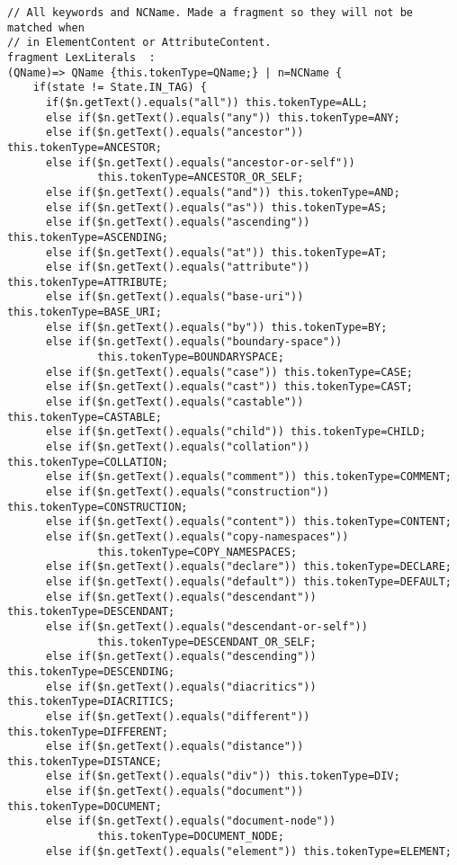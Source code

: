 \begin{Verbatim}[frame=none, fontsize=\footnotesize]
// All keywords and NCName. Made a fragment so they will not be matched when
// in ElementContent or AttributeContent.
fragment LexLiterals  : 
(QName)=> QName {this.tokenType=QName;} | n=NCName {
    if(state != State.IN_TAG) {
      if($n.getText().equals("all")) this.tokenType=ALL;
      else if($n.getText().equals("any")) this.tokenType=ANY;
      else if($n.getText().equals("ancestor")) this.tokenType=ANCESTOR;
      else if($n.getText().equals("ancestor-or-self")) 
              this.tokenType=ANCESTOR_OR_SELF;
      else if($n.getText().equals("and")) this.tokenType=AND;
      else if($n.getText().equals("as")) this.tokenType=AS;
      else if($n.getText().equals("ascending")) this.tokenType=ASCENDING;
      else if($n.getText().equals("at")) this.tokenType=AT;
      else if($n.getText().equals("attribute")) this.tokenType=ATTRIBUTE;
      else if($n.getText().equals("base-uri")) this.tokenType=BASE_URI;
      else if($n.getText().equals("by")) this.tokenType=BY;
      else if($n.getText().equals("boundary-space")) 
              this.tokenType=BOUNDARYSPACE;
      else if($n.getText().equals("case")) this.tokenType=CASE;
      else if($n.getText().equals("cast")) this.tokenType=CAST;
      else if($n.getText().equals("castable")) this.tokenType=CASTABLE;
      else if($n.getText().equals("child")) this.tokenType=CHILD;
      else if($n.getText().equals("collation")) this.tokenType=COLLATION;
      else if($n.getText().equals("comment")) this.tokenType=COMMENT;
      else if($n.getText().equals("construction")) this.tokenType=CONSTRUCTION;
      else if($n.getText().equals("content")) this.tokenType=CONTENT;
      else if($n.getText().equals("copy-namespaces")) 
              this.tokenType=COPY_NAMESPACES;
      else if($n.getText().equals("declare")) this.tokenType=DECLARE;
      else if($n.getText().equals("default")) this.tokenType=DEFAULT;
      else if($n.getText().equals("descendant")) this.tokenType=DESCENDANT;
      else if($n.getText().equals("descendant-or-self"))  
              this.tokenType=DESCENDANT_OR_SELF;
      else if($n.getText().equals("descending")) this.tokenType=DESCENDING;
      else if($n.getText().equals("diacritics")) this.tokenType=DIACRITICS;
      else if($n.getText().equals("different")) this.tokenType=DIFFERENT;
      else if($n.getText().equals("distance")) this.tokenType=DISTANCE;
      else if($n.getText().equals("div")) this.tokenType=DIV;
      else if($n.getText().equals("document")) this.tokenType=DOCUMENT;
      else if($n.getText().equals("document-node")) 
              this.tokenType=DOCUMENT_NODE;
      else if($n.getText().equals("element")) this.tokenType=ELEMENT;

\end{Verbatim}
